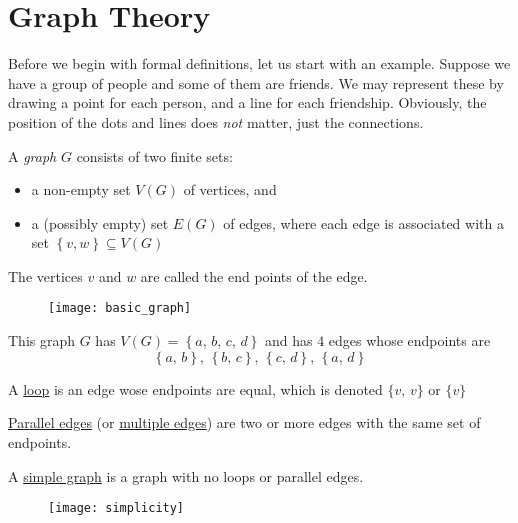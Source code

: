 \section{Graph Theory}
Before we begin with formal definitions, let us start with an example. Suppose we have a group of people and some of them are friends. We may represent these by drawing a point for each person, and a line for each friendship. Obviously, the position of the dots and lines does \emph{not} matter, just the connections.

\begin{definition}
    A \emph{graph} $G$ consists of two finite sets:
    \begin{itemize}
        \item a non-empty set $V(G)$ of vertices, and
        \item a (possibly empty) set $E(G)$ of edges, where each edge is associated with a set $\left\{v,w\right\}\subseteq V(G)$
    \end{itemize}

    The vertices $v$ and $w$ are called the end points of the edge.
\end{definition}

\begin{example}
    \begin{figure}[H]
        \centering
        \texttt{[image: basic\_graph]}
    \end{figure}

    This graph $G$ has $V(G) = \left\{a,\,b,\,c,\,d\right\}$ and has $4$ edges whose endpoints are $$\left\{a,\,b\right\},\,\left\{b,\,c\right\},\,\left\{c,\,d\right\},\,\left\{a,\,d\right\}$$
\end{example}

\begin{definition}
    A \underline{loop} is an edge wose endpoints are equal, which is denoted $\{v,\,v\}$ or $\{v\}$
\end{definition}

\begin{definition}
    \underline{Parallel edges} (or \underline{multiple edges}) are two or more edges with the same set of endpoints.
\end{definition}

\begin{definition}
    A \underline{simple graph} is a graph with no loops or parallel edges.

    \begin{figure}[H]
        \centering
        \texttt{[image: simplicity]}
    \end{figure}
\end{definition}

